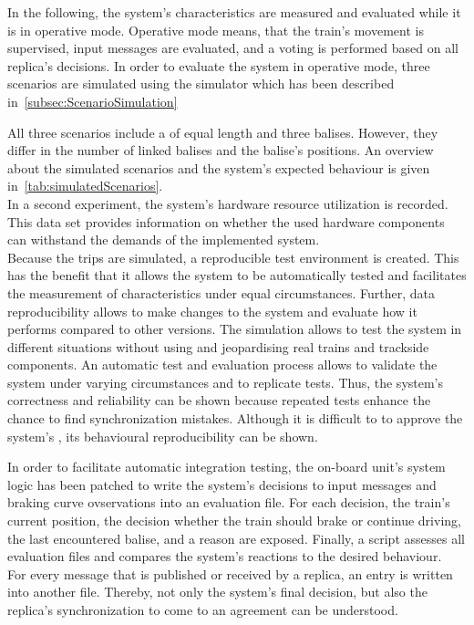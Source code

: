 In the following, the system's characteristics are measured and evaluated while it is in operative mode.
Operative mode means, that the train's movement is supervised, input messages are evaluated, and a voting is performed based on all replica's decisions.
In order to evaluate the system in operative mode, three scenarios are simulated using the simulator which has been described in~\autoref{subsec:ScenarioSimulation}

All three scenarios include a  of equal length and three balises.
However, they differ in the number of linked balises and the balise's positions.
An overview about the simulated scenarios and the system's expected behaviour is given in~\autoref{tab:simulatedScenarios}.
\\

In a second experiment, the system's hardware resource utilization is recorded.
This data set provides information on whether the used hardware components can withstand the demands of the implemented system.
\\

Because the trips are simulated, a reproducible test environment is created.
This has the benefit that it allows the system to be automatically tested and facilitates the measurement of characteristics under equal circumstances.
Further, data reproducibility allows to make changes to the system and evaluate how it performs compared to other versions.
The simulation allows to test the system in different situations without using and jeopardising real trains and trackside components.
An automatic test and evaluation process allows to validate the system under varying circumstances and to replicate tests.
Thus, the system's correctness and reliability can be shown because repeated tests enhance the chance to find synchronization mistakes.
Although it is difficult to to approve the system's , its behavioural reproducibility can be shown.

In order to facilitate automatic integration testing, the on-board unit's system logic has been patched to write the system's decisions to input messages and braking curve ovservations into an evaluation file.
For each decision, the train's current position, the decision whether the train should brake or continue driving, the last encountered balise, and a reason are exposed.
Finally, a script assesses all evaluation files and compares the system's reactions to the desired behaviour.
\\

For every message that is published or received by a replica, an entry is written into another file.
Thereby, not only the system's final decision, but also the replica's synchronization to come to an agreement can be understood.

